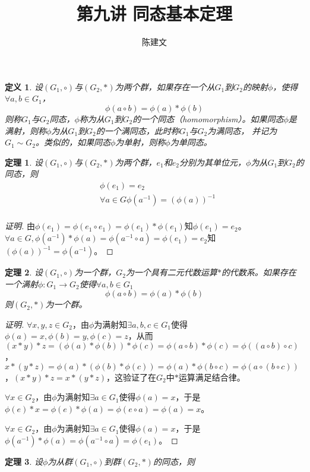 \documentclass{article}
\newtheorem{Def}{定义}
\newtheorem{Thm}{定理}
\begin{document}
\begin{CJK*}{UTF8}{gbsn}
  \title{第九讲 同态基本定理}
  \author{陈建文}
  \maketitle
  

\begin{Def}
  设$(G_1,\circ)$与$(G_2,*)$为两个群，如果存在一个从$G_1$到$G_2$的映射$\phi$，使得$\forall a,b\in G_1$，\[\phi(a\circ b)=\phi(a)* \phi(b)\]
  则称$G_1$与$G_2$同态，$\phi$称为从$G_1$到$G_2$的一个同态（homomorphism）。如果同态$\phi$是满射，则称$\phi$为从$G_1$到$G_2$的一个满同态，此时称$G_1$与$G_2$为满同态，
  并记为$G_1\sim G_2$。类似的，如果同态$\phi$为单射，则称$\phi$为单同态。
\end{Def}

\begin{Thm}
  设$(G_1,\circ)$与$(G_2,*)$为两个群，$e_1$和$e_2$分别为其单位元，$\phi$为从$G_1$到$G_2$的同态，则
  \begin{align*}
    &\phi(e_1)=e_2\\
    &\forall a\in G \phi(a^{-1})=(\phi(a))^{-1}\\
  \end{align*}
\end{Thm}
\begin{proof}[证明]
  由$\phi(e_1)=\phi(e_1\circ e_1)=\phi(e_1)*\phi(e_1)$知$\phi(e_1)=e_2$。
  $\forall a\in G, \phi(a^{-1})*\phi(a)=\phi(a^{-1}\circ a)=\phi(e_1)=e_2$知$(\phi(a))^{-1}=\phi(a^{-1})$。
\end{proof}
\begin{Thm}
  设$(G_1,\circ)$为一个群，$G_2$为一个具有二元代数运算$*$的代数系。如果存在一个满射$\phi:G_1\to G_2$使得$\forall a,b\in G_1$
  \[\phi(a\circ b)=\phi(a) * \phi(b)\]
  则$(G_2,*)$为一个群。
\end{Thm}
\begin{proof}[证明]
  $\forall x,y,z\in G_2$，由$\phi$为满射知$\exists a,b,c\in G_1$使得$\phi(a)=x,\phi(b)=y,\phi(c)=z$，从而
  $(x*y)*z=(\phi(a)*\phi(b))*\phi(c)=\phi(a\circ b)*\phi(c)=\phi((a\circ b)\circ c)$，$x*(y*z)=\phi(a)* (\phi(b)*\phi(c))=\phi(a)*\phi(b\circ c)=\phi(a\circ (b\circ c))$，$(x*y)*z=x*(y*z)$，这验证了在$G_2$中$*$运算满足结合律。

  $\forall x\in G_2$，由$\phi$为满射知$\exists a\in G_1$使得$\phi(a)=x$，于是$\phi(e)*x=\phi(e)*\phi(a)=\phi(e\circ a)=\phi(a)=x$。

  $\forall x\in G_2$，由$\phi$为满射知$\exists a\in G_1$使得$\phi(a)=x$，于是$\phi(a^{-1})*\phi(a)=\phi(a^{-1}\circ a)=\phi(e_1)$。
\end{proof}
\begin{Thm}
  设$\phi$为从群$(G_1,\circ)$到群$(G_2,*)$的同态，则


\end{Thm}
\end{CJK*}
\end{document}
